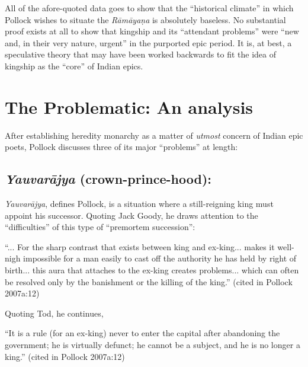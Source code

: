 All of the afore-quoted data goes to show that the “historical climate” in which Pollock wishes to situate the {\sl Rāmāyaṇa} is absolutely baseless. No substantial proof exists at all to show that kingship and its “attendant problems” were “new and, in their very nature, urgent” in the purported epic period. It is, at best, a speculative theory that may have been worked backwards to fit the idea of kingship as the “core” of Indian epics.\\[-21pt]  

\section{The Problematic: An analysis}\label{sec1.2}

After establishing heredity monarchy as a matter of {\sl utmost} concern of Indian epic poets, Pollock discusses three of its major “problems” at length:\\[-21pt]   

\subsection{{\sl\bfseries Yauvarājya} (crown-prince-hood):}\label{sec1.2.1}

{\sl Yauvarājya}, defines Pollock, is a situation where a still-reigning king must appoint his successor. Quoting Jack Goody, he draws attention to the “difficulties” of this type of “premortem succession”:

\begin{myquote}
 “... For the sharp contrast that exists between king and ex-king... makes it well-nigh impossible for a man easily to cast off the authority he has held by right of birth... this aura that attaches to the ex-king creates problems... which can often be resolved only by the banishment or the killing of the king.” 
\hfill (cited in Pollock 2007a:12)
\end{myquote}

Quoting Tod, he continues,

\begin{myquote}
“It is a rule (for an ex-king) never to enter the capital after abandoning the government; he is virtually defunct; he cannot be a subject, and he is no longer a king.”
\hfill (cited in Pollock 2007a:12)
\end{myquote}


